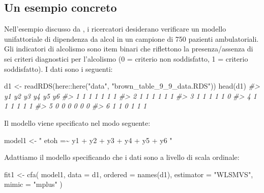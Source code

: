 \documentclass[
  11pt,
]{krantz}
\makeatletter
\newenvironment{Shaded}{\begin{snugshade}}{\end{snugshade}}
\newcommand{\AttributeTok}[1]{\textcolor[rgb]{0.61,0.61,0.61}{#1}}
\newcommand{\CommentTok}[1]{\textcolor[rgb]{0.37,0.37,0.37}{\textit{#1}}}
\newcommand{\FunctionTok}[1]{\textcolor[rgb]{0,0,0}{#1}}
\newcommand{\NormalTok}[1]{#1}
\newcommand{\OtherTok}[1]{\textcolor[rgb]{0.37,0.37,0.37}{#1}}
\newcommand{\SpecialCharTok}[1]{\textcolor[rgb]{0,0,0}{#1}}
\newcommand{\StringTok}[1]{\textcolor[rgb]{0.5,0.5,0.5}{#1}}
\newenvironment{kframe}{%
\medskip{}
\setlength{\fboxsep}{.8em}
 \def\at@end@of@kframe{}%
 \ifinner\ifhmode%
  \def\at@end@of@kframe{\end{minipage}}%
  \begin{minipage}{\columnwidth}%
 \fi\fi%
 \def\FrameCommand##1{\hskip\@totalleftmargin \hskip-\fboxsep
 \colorbox{shadecolor}{##1}\hskip-\fboxsep
     \hskip-\linewidth \hskip-\@totalleftmargin \hskip\columnwidth}%
 \MakeFramed {\advance\hsize-\width
   \@totalleftmargin\z@ \linewidth\hsize
   \@setminipage}}%
 {\par\unskip\endMakeFramed%
 \at@end@of@kframe}
\renewenvironment{Shaded}{\begin{kframe}}{\end{kframe}}
\theoremstyle{definition}
\theoremstyle{definition}
\theoremstyle{definition}
\theoremstyle{definition}
\theoremstyle{remark}
\makeatother
\begin{document}
\hypertarget{un-esempio-concreto-6}{%
\subsection{Un esempio concreto}\label{un-esempio-concreto-6}}

Nell'esempio discusso da \citet{brown2015confirmatory}, i ricercatori desiderano verificare un modello unifattoriale di dipendenza da alcol in un campione di 750 pazienti ambulatoriali. Gli indicatori di alcolismo sono item binari che riflettono la presenza/assenza di sei criteri diagnostici per l'alcolismo (0 = criterio non soddisfatto, 1 = criterio soddisfatto). I dati sono i seguenti:

\begin{Shaded}
\begin{Highlighting}[]
\NormalTok{d1 }\OtherTok{\textless{}{-}} \FunctionTok{readRDS}\NormalTok{(here}\SpecialCharTok{::}\FunctionTok{here}\NormalTok{(}\StringTok{"data"}\NormalTok{, }\StringTok{"brown\_table\_9\_9\_data.RDS"}\NormalTok{))}
\FunctionTok{head}\NormalTok{(d1)}
\CommentTok{\#\textgreater{}   y1 y2 y3 y4 y5 y6}
\CommentTok{\#\textgreater{} 1  1  1  1  1  1  1}
\CommentTok{\#\textgreater{} 2  1  1  1  1  1  1}
\CommentTok{\#\textgreater{} 3  1  1  1  1  1  0}
\CommentTok{\#\textgreater{} 4  1  1  1  1  1  1}
\CommentTok{\#\textgreater{} 5  0  0  0  0  0  0}
\CommentTok{\#\textgreater{} 6  1  1  0  1  1  1}
\end{Highlighting}
\end{Shaded}

Il modello viene specificato nel modo seguente:

\begin{Shaded}
\begin{Highlighting}[]
\NormalTok{model1 }\OtherTok{\textless{}{-}} \StringTok{"}
\StringTok{  etoh =\textasciitilde{} y1 + y2 + y3 + y4 + y5 + y6}
\StringTok{"}
\end{Highlighting}
\end{Shaded}

Adattiamo il modello specificando che i dati sono a livello di scala ordinale:

\begin{Shaded}
\begin{Highlighting}[]
\NormalTok{fit1 }\OtherTok{\textless{}{-}} \FunctionTok{cfa}\NormalTok{(}
\NormalTok{  model1,}
  \AttributeTok{data =}\NormalTok{ d1,}
  \AttributeTok{ordered =} \FunctionTok{names}\NormalTok{(d1),}
  \AttributeTok{estimator =} \StringTok{"WLSMVS"}\NormalTok{,}
  \AttributeTok{mimic =} \StringTok{"mplus"}
\NormalTok{)}
\end{Highlighting}
\end{Shaded}
\end{document}
